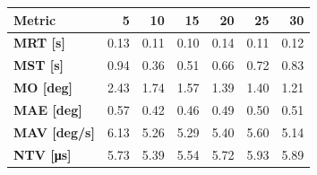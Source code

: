 \begin{tabular*}{\linewidth}{@{\extracolsep{\fill}}l|rrrrrr}
    \toprule
    \textbf{Metric} & \textbf{5} & \textbf{10} & \textbf{15} & \textbf{20} & \textbf{25} & \textbf{30} \\
    \midrule
    \textbf{MRT [s]} & 0.13 & 0.11 & 0.10 & 0.14 & 0.11 & 0.12 \\
    \textbf{MST [s]} & 0.94 & 0.36 & 0.51 & 0.66 & 0.72 & 0.83 \\
    \textbf{MO  [deg]} & 2.43 & 1.74 & 1.57 & 1.39 & 1.40 & 1.21 \\
    \textbf{MAE [deg]} & 0.57 & 0.42 & 0.46 & 0.49 & 0.50 & 0.51 \\
    \textbf{MAV [deg/s]} & 6.13 & 5.26 & 5.29 & 5.40 & 5.60 & 5.14 \\
    \textbf{NTV [\si{\micro\second}]} & 5.73 & 5.39 & 5.54 & 5.72 & 5.93 & 5.89 \\
    \bottomrule
\end{tabular*}

